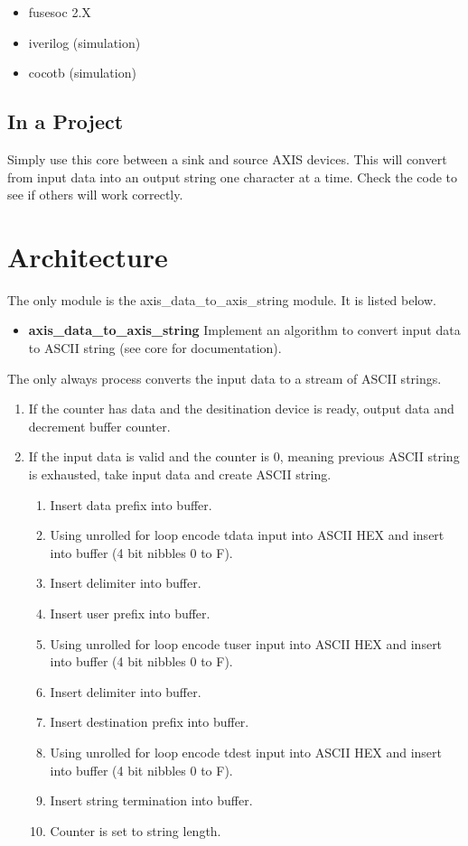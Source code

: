 \begin{itemize}
  \item fusesoc 2.X
  \item iverilog (simulation)
  \item cocotb (simulation)
\end{itemize}



\subsection{In a Project}
\par
Simply use this core between a sink and source AXIS devices. This will convert from input data into an output string one character at a time.
Check the code to see if others will work correctly.

\section{Architecture}
\par
The only module is the axis\_data\_to\_axis\_string module. It is listed below.

\begin{itemize}
  \item \textbf{axis\_data\_to\_axis\_string } Implement an algorithm to convert input data to ASCII string (see core for documentation).
\end{itemize}

\par
The only always process converts the input data to a stream of ASCII strings.
\begin{enumerate}
\item If the counter has data and the desitination device is ready, output data and decrement buffer counter.
\item If the input data is valid and the counter is 0, meaning previous ASCII string is exhausted, take input data and create ASCII string.
  \begin{enumerate}
    \item Insert data prefix into buffer.
    \item Using unrolled for loop encode tdata input into ASCII HEX and insert into buffer (4 bit nibbles 0 to F).
    \item Insert delimiter into buffer.
    \item Insert user prefix into buffer.
    \item Using unrolled for loop encode tuser input into ASCII HEX and insert into buffer (4 bit nibbles 0 to F).
    \item Insert delimiter into buffer.
    \item Insert destination prefix into buffer.
    \item Using unrolled for loop encode tdest input into ASCII HEX and insert into buffer (4 bit nibbles 0 to F).
    \item Insert string termination into buffer.
    \item Counter is set to string length.
  \end{enumerate}
\end{enumerate}

